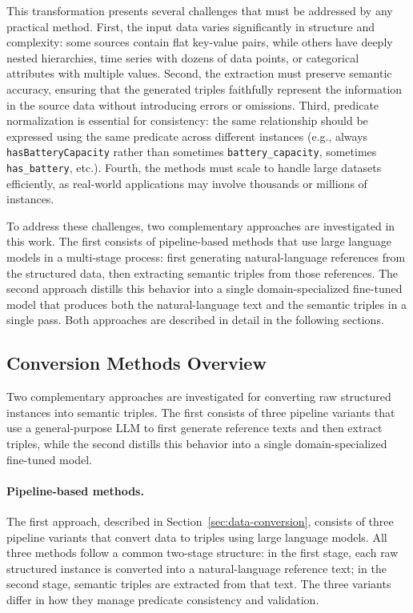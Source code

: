 This transformation presents several challenges that must be addressed by any practical method. First, the input data varies significantly in structure and complexity: some sources contain flat key-value pairs, while others have deeply nested hierarchies, time series with dozens of data points, or categorical attributes with multiple values. Second, the extraction must preserve semantic accuracy, ensuring that the generated triples faithfully represent the information in the source data without introducing errors or omissions. Third, predicate normalization is essential for consistency: the same relationship should be expressed using the same predicate across different instances (e.g., always \texttt{hasBatteryCapacity} rather than sometimes \texttt{battery\_capacity}, sometimes \texttt{has\_battery}, etc.). Fourth, the methods must scale to handle large datasets efficiently, as real-world applications may involve thousands or millions of instances.

To address these challenges, two complementary approaches are investigated in this work. The first consists of pipeline-based methods that use large language models in a multi-stage process: first generating natural-language references from the structured data, then extracting semantic triples from those references. The second approach distills this behavior into a single domain-specialized fine-tuned model that produces both the natural-language text and the semantic triples in a single pass. Both approaches are described in detail in the following sections.

\subsection{Conversion Methods Overview}

Two complementary approaches are investigated for converting raw structured instances into semantic triples. The first consists of three pipeline variants that use a general-purpose LLM to first generate reference texts and then extract triples, while the second distills this behavior into a single domain-specialized fine-tuned model.

\paragraph{Pipeline-based methods.}
The first approach, described in Section~\ref{sec:data-conversion}, consists of three pipeline variants that convert data to triples using large language models. All three methods follow a common two-stage structure: in the first stage, each raw structured instance is converted into a natural-language reference text; in the second stage, semantic triples are extracted from that text. The three variants differ in how they manage predicate consistency and validation.

